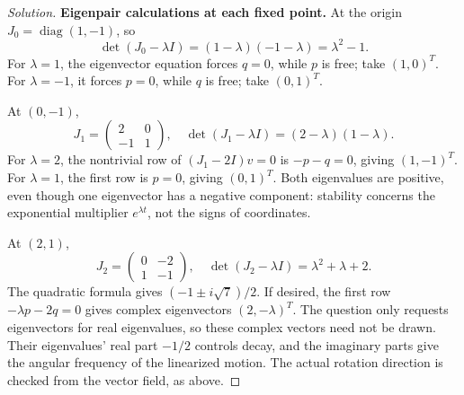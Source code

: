 \documentclass[10pt]{amsart}
\newenvironment{solution}
{\begin{proof}[Solution]}
{\end{proof}}
\begin{document}
\begin{enumerate}[label=\arabic*), leftmargin=*, itemsep=1em]
\begin{solution}
\medskip\noindent\textbf{Eigenpair calculations at each fixed point.}
At the origin $J_0=\operatorname{diag}(1,-1)$, so
\[
\det(J_0-\lambda I)=(1-\lambda)(-1-\lambda)=\lambda^2-1.
\]
For $\lambda=1$, the eigenvector equation forces $q=0$, while $p$ is free; take $(1,0)^T$. For $\lambda=-1$, it forces $p=0$, while $q$ is free; take $(0,1)^T$.

At $(0,-1)$,
\[
J_1=\begin{pmatrix}2&0\\-1&1\end{pmatrix},\quad
\det(J_1-\lambda I)=(2-\lambda)(1-\lambda).
\]
For $\lambda=2$, the nontrivial row of $(J_1-2I)v=0$ is $-p-q=0$, giving $(1,-1)^T$. For $\lambda=1$, the first row is $p=0$, giving $(0,1)^T$. Both eigenvalues are positive, even though one eigenvector has a negative component: stability concerns the exponential multiplier $e^{\lambda t}$, not the signs of coordinates.

At $(2,1)$,
\[
J_2=\begin{pmatrix}0&-2\\1&-1\end{pmatrix},\quad
\det(J_2-\lambda I)=\lambda^2+\lambda+2.
\]
The quadratic formula gives $(-1\pm i\sqrt7)/2$. If desired, the first row $-\lambda p-2q=0$ gives complex eigenvectors $(2,-\lambda)^T$. The question only requests eigenvectors for real eigenvalues, so these complex vectors need not be drawn. Their eigenvalues' real part $-1/2$ controls decay, and the imaginary parts give the angular frequency of the linearized motion. The actual rotation direction is checked from the vector field, as above.


\end{solution}
\end{enumerate}
\end{document}

